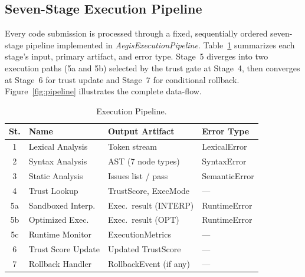 \documentclass[conference]{IEEEtran}
\begin{document}
\subsection{Seven-Stage Execution Pipeline}

Every code submission is processed through a fixed, sequentially
ordered seven-stage pipeline implemented in
\textit{AegisExecutionPipeline}. Table~\ref{tab:pipeline} summarizes
each stage's input, primary artifact, and error type. Stage~5
diverges into two execution paths (5a and 5b) selected by the trust
gate at Stage~4, then converges at Stage~6 for trust update and
Stage~7 for conditional rollback. Figure~\ref{fig:pipeline}
illustrates the complete data-flow.

\begin{table}[t]
\caption{Execution Pipeline.}
\label{tab:pipeline}
\centering
\renewcommand{\arraystretch}{1.18}
\small
\begin{tabular}{@{}c p{1.65cm} p{2.1cm} p{1.6cm}@{}}
\toprule
\textbf{St.} & \textbf{Name} & \textbf{Output Artifact} &
\textbf{Error Type} \\
\midrule
1  & Lexical Analysis     & Token stream              & LexicalError \\
2  & Syntax Analysis      & AST (7 node types)        & SyntaxError  \\
3  & Static Analysis      & Issues list / pass        & SemanticError\\
4  & Trust Lookup         & TrustScore, ExecMode      & ---          \\
5a & Sandboxed Interp.    & Exec.\ result (INTERP)    & RuntimeError \\
5b & Optimized Exec.      & Exec.\ result (OPT)       & RuntimeError \\
5c & Runtime Monitor      & ExecutionMetrics          & ---          \\
6  & Trust Score Update   & Updated TrustScore        & ---          \\
7  & Rollback Handler     & RollbackEvent (if any)    & ---          \\
\bottomrule
\end{tabular}
\end{table}
\end{document}
